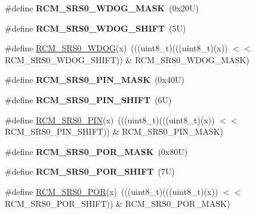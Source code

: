 \begin{DoxyCompactItemize}
\#define {\bfseries R\+C\+M\+\_\+\+S\+R\+S0\+\_\+\+W\+D\+O\+G\+\_\+\+M\+A\+SK}~(0x20\+U)
\item 
\mbox{\label{group___r_c_m___register___masks_gac989a90d61cdfb7e612c212a3f6d06d8}} 
\#define {\bfseries R\+C\+M\+\_\+\+S\+R\+S0\+\_\+\+W\+D\+O\+G\+\_\+\+S\+H\+I\+FT}~(5\+U)
\item 
\#define \mbox{\hyperlink{group___r_c_m___register___masks_ga3fcc4adf18ac9fce24a75a51e11853b2}{R\+C\+M\+\_\+\+S\+R\+S0\+\_\+\+W\+D\+OG}}(x)~(((uint8\+\_\+t)(((uint8\+\_\+t)(x)) $<$$<$ R\+C\+M\+\_\+\+S\+R\+S0\+\_\+\+W\+D\+O\+G\+\_\+\+S\+H\+I\+FT)) \& R\+C\+M\+\_\+\+S\+R\+S0\+\_\+\+W\+D\+O\+G\+\_\+\+M\+A\+SK)
\item 
\mbox{\label{group___r_c_m___register___masks_gab94707d2e91618c8c803dfa2d8df4e7b}} 
\#define {\bfseries R\+C\+M\+\_\+\+S\+R\+S0\+\_\+\+P\+I\+N\+\_\+\+M\+A\+SK}~(0x40\+U)
\item 
\mbox{\label{group___r_c_m___register___masks_ga1c1ae6946300c9f33bf5575d45d2b862}} 
\#define {\bfseries R\+C\+M\+\_\+\+S\+R\+S0\+\_\+\+P\+I\+N\+\_\+\+S\+H\+I\+FT}~(6\+U)
\item 
\#define \mbox{\hyperlink{group___r_c_m___register___masks_ga01275058684ccfde7a61e741061ba7e8}{R\+C\+M\+\_\+\+S\+R\+S0\+\_\+\+P\+IN}}(x)~(((uint8\+\_\+t)(((uint8\+\_\+t)(x)) $<$$<$ R\+C\+M\+\_\+\+S\+R\+S0\+\_\+\+P\+I\+N\+\_\+\+S\+H\+I\+FT)) \& R\+C\+M\+\_\+\+S\+R\+S0\+\_\+\+P\+I\+N\+\_\+\+M\+A\+SK)
\item 
\mbox{\label{group___r_c_m___register___masks_gad172e7645b5b6a0c5a2ff91db3087f7e}} 
\#define {\bfseries R\+C\+M\+\_\+\+S\+R\+S0\+\_\+\+P\+O\+R\+\_\+\+M\+A\+SK}~(0x80\+U)
\item 
\mbox{\label{group___r_c_m___register___masks_ga98b995f8d56d338b315d6750072474ff}} 
\#define {\bfseries R\+C\+M\+\_\+\+S\+R\+S0\+\_\+\+P\+O\+R\+\_\+\+S\+H\+I\+FT}~(7\+U)
\item 
\#define \mbox{\hyperlink{group___r_c_m___register___masks_ga8af82fba8382caacead43eddbaae9f1c}{R\+C\+M\+\_\+\+S\+R\+S0\+\_\+\+P\+OR}}(x)~(((uint8\+\_\+t)(((uint8\+\_\+t)(x)) $<$$<$ R\+C\+M\+\_\+\+S\+R\+S0\+\_\+\+P\+O\+R\+\_\+\+S\+H\+I\+FT)) \& R\+C\+M\+\_\+\+S\+R\+S0\+\_\+\+P\+O\+R\+\_\+\+M\+A\+SK)
\end{DoxyCompactItemize}
